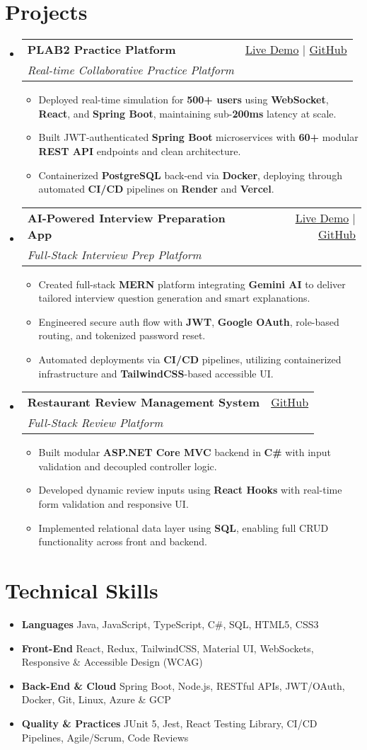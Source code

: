 \documentclass[letterpaper,11pt]{article}
\makeatletter
\newcommand{\resumeItem}[1]{\item\small{#1 \vspace{-2pt}}}
\newcommand{\resumeSubheading}[4]{
  \vspace{-1pt}\item
    \begin{tabular*}{0.97\textwidth}[t]{l@{\extracolsep{\fill}}r}
      \textbf{#1} & #2 \\
      \textit{\small#3} & \textit{\small #4} \\
    \end{tabular*}\vspace{-5pt}
}
\newcommand{\resumeSubHeadingListStart}{\begin{itemize}[leftmargin=*]}
\newcommand{\resumeSubHeadingListEnd}{\end{itemize}}
\newcommand{\resumeItemListStart}{\begin{itemize}}
\newcommand{\resumeItemListEnd}{\end{itemize}\vspace{-5pt}}
\makeatother
\begin{document}
\section{Projects}
  \resumeSubHeadingListStart
    \resumeSubheading
      {\textbf{PLAB2 Practice Platform}}{\href{https://plab2practice.com}{Live Demo} | \href{https://github.com/altansaid/plab2projectnew}{GitHub}}
      {Real-time Collaborative Practice Platform}{}
      \resumeItemListStart
        \resumeItem{Deployed real-time simulation for \textbf{500+ users} using \textbf{WebSocket}, \textbf{React}, and \textbf{Spring Boot}, maintaining sub-\textbf{200ms} latency at scale.}
        \resumeItem{Built JWT-authenticated \textbf{Spring Boot} microservices with \textbf{60+} modular \textbf{REST API} endpoints and clean architecture.}
        \resumeItem{Containerized \textbf{PostgreSQL} back-end via \textbf{Docker}, deploying through automated \textbf{CI/CD} pipelines on \textbf{Render} and \textbf{Vercel}.}
      \resumeItemListEnd

    \resumeSubheading
      {\textbf{AI-Powered Interview Preparation App}}{\href{https://interviewcoach-ai.vercel.app}{Live Demo} | \href{https://github.com/altansaid/interviewcoach-ai}{GitHub}}
      {Full-Stack Interview Prep Platform}{}
      \resumeItemListStart
        \resumeItem{Created full-stack \textbf{MERN} platform integrating \textbf{Gemini AI} to deliver tailored interview question generation and smart explanations.}
        \resumeItem{Engineered secure auth flow with \textbf{JWT}, \textbf{Google OAuth}, role-based routing, and tokenized password reset.}
        \resumeItem{Automated deployments via \textbf{CI/CD} pipelines, utilizing containerized infrastructure and \textbf{TailwindCSS}-based accessible UI.}
      \resumeItemListEnd

    \resumeSubheading
      {\textbf{Restaurant Review Management System}}{\href{https://github.com/altansaid/restaurantreviewmanagementsystem}{GitHub}}{Full-Stack Review Platform}{}
      \resumeItemListStart
        \resumeItem{Built modular \textbf{ASP.NET Core MVC} backend in \textbf{C\#} with input validation and decoupled controller logic.}
        \resumeItem{Developed dynamic review inputs using \textbf{React Hooks} with real-time form validation and responsive UI.}
        \resumeItem{Implemented relational data layer using \textbf{SQL}, enabling full CRUD functionality across front and backend.}
      \resumeItemListEnd
  \resumeSubHeadingListEnd

\section{Technical Skills}
  \resumeItemListStart
    \resumeItem{\textbf{Languages}}{Java, JavaScript, TypeScript, C\#, SQL, HTML5, CSS3}
    \resumeItem{\textbf{Front-End}}{React, Redux, TailwindCSS, Material UI, WebSockets, Responsive \& Accessible Design (WCAG)}
    \resumeItem{\textbf{Back-End \& Cloud}}{Spring Boot, Node.js, RESTful APIs, JWT/OAuth, Docker, Git, Linux, Azure \& GCP}
    \resumeItem{\textbf{Quality \& Practices}}{JUnit 5, Jest, React Testing Library, CI/CD Pipelines, Agile/Scrum, Code Reviews}
  \resumeItemListEnd
\end{document}
